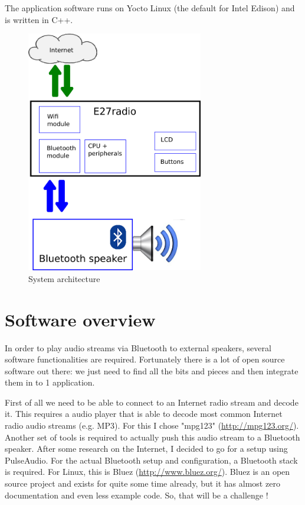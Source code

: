 \documentclass[12pt,a4paper]{scrreprt}
\begin{document}
The application software runs on Yocto Linux (the default for Intel Edison) and is written in C++.

\begin{figure}[h]
	\includegraphics[height=400px]{images/architecture}
	\caption{System architecture}
\end{figure}


\section{Software overview}
In order to play audio streams via Bluetooth to external speakers, several software functionalities are required. Fortunately there is a lot of open source software out there: we just need to find all the bits and pieces and then integrate them in to 1 application.

First of all we need to be able to connect to an Internet radio stream and decode it. This requires a audio player that is able to decode  most common Internet radio audio streams (e.g. MP3). For this I chose "mpg123" (\url{http://mpg123.org/}). Another set of tools is required to actually push this audio stream to a Bluetooth speaker. 
After some research on the Internet, I decided to go for a setup using PulseAudio.
For the actual Bluetooth setup and configuration, a Bluetooth stack is required. For Linux, this is Bluez (\url{http://www.bluez.org/}). 
Bluez is an open source project and exists for quite some time already, but it has almost zero documentation and even less example code. So, that will be a challenge !
\end{document}

